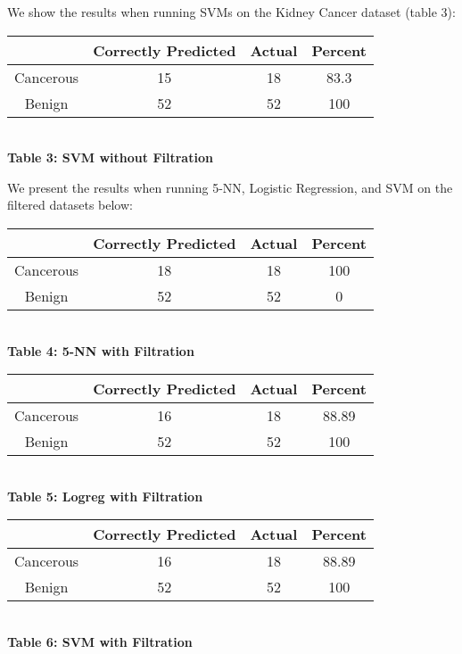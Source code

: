 \documentclass[12pt]{scrartcl}
\begin{document}
    We show the results when running SVMs on the Kidney Cancer dataset (table 3):
    
    \begin{center}
    \begin{tabular}{c|c|c|c}
    \hline
    & Correctly Predicted & Actual & Percent\\
    \hline
    Cancerous & 15 & 18 & 83.3\\
    Benign & 52 & 52 & 100\\
    \hline
    \end{tabular}\\
    \vspace{0.1in}
    \textbf{Table 3: SVM without Filtration}
    \end{center}
    
    We present the results when running 5-NN, Logistic Regression, and SVM on the filtered datasets below:
    
    \begin{center}
    \begin{tabular}{c|c|c|c}
    \hline
    & Correctly Predicted & Actual & Percent\\
    \hline
    Cancerous & 18 & 18 & 100\\
    Benign & 52 & 52 & 0\\
    \hline
    \end{tabular}\\
    \vspace{0.1in}
    \textbf{Table 4: 5-NN with Filtration}
    \end{center}
    
    \begin{center}
    \begin{tabular}{c|c|c|c}
    \hline
    & Correctly Predicted & Actual & Percent\\
    \hline
    Cancerous & 16 & 18 & 88.89\\
    Benign & 52 & 52 & 100\\
    \hline
    \end{tabular}\\
    \vspace{0.1in}
    \textbf{Table 5: Logreg with Filtration}
    \end{center}
    
    \begin{center}
    \begin{tabular}{c|c|c|c}
    \hline
    & Correctly Predicted & Actual & Percent\\
    \hline
    Cancerous & 16 & 18 & 88.89\\
    Benign & 52 & 52 & 100\\
    \hline
    \end{tabular}\\
    \vspace{0.1in}
    \textbf{Table 6: SVM with Filtration}
    \end{center}
    
\end{document}
